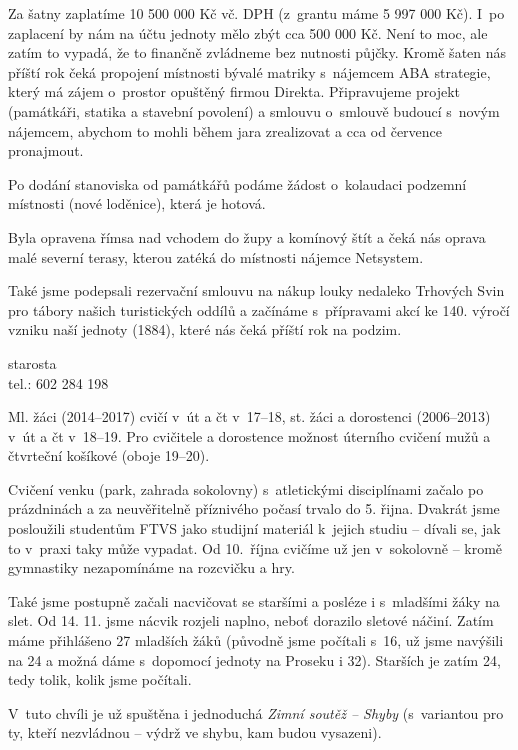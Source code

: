 \documentclass[11pt]{article}
\begin{document}
Za šatny zaplatíme 10 500 000 Kč vč. DPH (z~grantu máme 5 997 000 Kč). I~po zaplacení by nám na účtu jednoty mělo zbýt cca 500 000 Kč. Není to moc, ale zatím to vypadá, že to finančně zvládneme bez nutnosti půjčky.
Kromě šaten nás příští rok čeká propojení místnosti bývalé matriky s~nájemcem ABA strategie, který má zájem o~prostor opuštěný firmou Direkta. Připravujeme projekt (památkáři, statika a stavební povolení) a smlouvu o~smlouvě budoucí s~novým nájemcem, abychom to mohli během jara zrealizovat a cca od července pronajmout. 

Po dodání stanoviska od památkářů podáme žádost o~kolaudaci podzemní místnosti (nové loděnice), která je hotová.

Byla opravena římsa nad vchodem do župy a komínový štít a čeká nás oprava malé severní terasy, kterou zatéká do místnosti nájemce Netsystem.

Také jsme podepsali rezervační smlouvu na nákup louky nedaleko Trhových Svin pro tábory našich turistických oddílů a začínáme s~přípravami akcí ke 140. výročí vzniku naší jednoty (1884), které nás čeká příští rok na podzim. 

\signature{Jiří Novák (Jirkan)}{starosta\\tel.: 602 284 198}

\vspace*{24pt}

\vspace*{-12pt}
Ml. žáci (2014–⁠2017) cvičí v~út a čt v~17–18, st. žáci a dorostenci (2006–⁠2013) v~út a čt v~18–19. Pro cvičitele a dorostence možnost úterního cvičení mužů a čtvrteční košíkové (oboje 19–20).

Cvičení venku (park, zahrada sokolovny) s~atletickými disciplínami začalo po prázdninách a za neuvěřitelně příznivého počasí trvalo do 5. řijna. Dvakrát jsme posloužili studentům FTVS jako studijní materiál k~jejich studiu – dívali se, jak to v~praxi taky může vypadat. Od 10.~října cvičíme už jen v~sokolovně – kromě gymnastiky nezapomínáme na rozcvičku a hry.

Také jsme postupně začali nacvičovat se staršími a posléze i s~mladšími žáky na slet. Od 14. 11. jsme nácvik rozjeli naplno, neboť dorazilo sletové náčiní. Zatím máme přihlášeno 27 mladších žáků (původně jsme počítali s~16, už jsme navýšili na 24 a možná dáme s~dopomocí jednoty na Proseku i 32). Starších je zatím 24, tedy tolik, kolik jsme počítali. 

V~tuto chvíli je už spuštěna i jednoduchá \textit{Zimní soutěž – Shyby} (s~variantou pro ty, kteří nezvládnou – výdrž ve shybu, kam budou vysazeni). 
\end{document}
